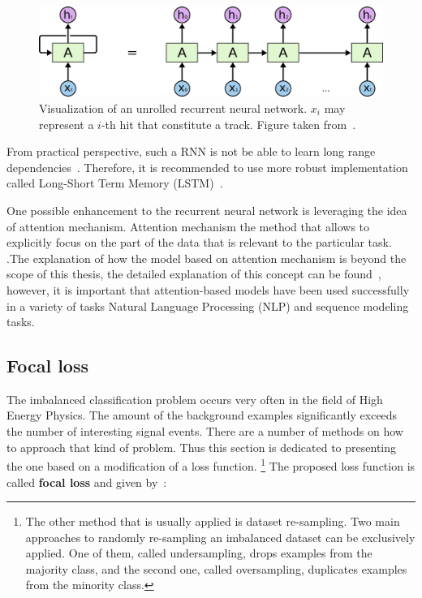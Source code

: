  \begin{figure}[!h]
\centering
\includegraphics{figures/RNN-unrolled.png}
\caption{Visualization of an unrolled recurrent neural network. $x_i$ may represent a $i$-th hit that constitute a track. Figure taken from~\cite{rnn}. 
\label{fig:rnn}}
\end{figure}

From practical perspective, such a RNN is not be able to learn long range dependencies~\cite{bengio_rnn}. Therefore, it is recommended to use more robust implementation called Long-Short Term Memory (LSTM)~\cite{lstm}. 


One possible enhancement to the recurrent neural network is leveraging the idea of attention mechanism. Attention mechanism the method that allows to explicitly focus on the part of the data that is relevant to the particular task. .The explanation of how the model based on attention mechanism is beyond the scope of this thesis, the detailed explanation of this concept can be found~\cite{attention}, however, it is important that attention-based models have been used successfully in a variety of tasks Natural Language Processing (NLP) and sequence modeling tasks. 

\subsection{Focal loss}
\label{sec:focal_loss}

The imbalanced classification problem occurs very often in the field of High Energy Physics. The amount of the background examples significantly exceeds the number of interesting signal events. There are a number of methods on how to approach that kind of problem. Thus this section is dedicated to presenting the one based on a modification of a loss function. \footnote{The other method that is usually applied is dataset re-sampling. Two main approaches to randomly re-sampling an imbalanced dataset can be exclusively applied. One of them, called undersampling, drops examples from the majority class, and the second one, called oversampling, duplicates examples from the minority class.}  The proposed loss function is called \textbf{focal loss} and given by~\cite{focal_loss}: 

